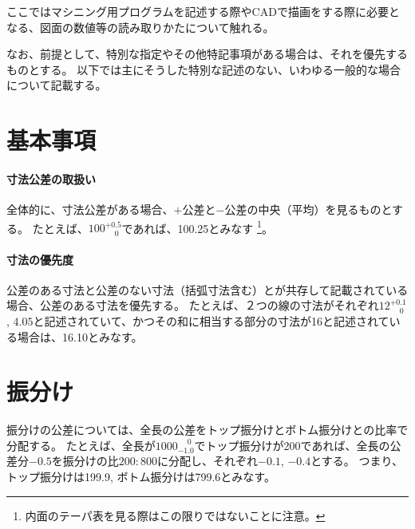 
ここではマシニング用プログラムを記述する際やCADで描画をする際に必要となる、図面の数値等の読み取りかたについて触れる。

なお、前提として、特別な指定やその他特記事項がある場合は、それを優先するものとする。
以下では主にそうした特別な記述のない、いわゆる一般的な場合について記載する。




\section{基本事項}
\paragraph{寸法公差の取扱い}\noindent
全体的に、寸法公差がある場合、$+$公差と$-$公差の中央（平均）を見るものとする。
たとえば、$100^{+0.5}_{\phantom -0}$であれば、100.25とみなす
\footnote{内面のテーパ表を見る際はこの限りではないことに注意。}。

\paragraph{寸法の優先度}\noindent
公差のある寸法と公差のない寸法（括弧寸法含む）とが共存して記載されている場合、公差のある寸法を優先する。
たとえば、２つの線の寸法がそれぞれ$12^{+0.1}_{\phantom -0}$, $4.05$と記述されていて、かつその和に相当する部分の寸法が16と記述されている場合は、16.10とみなす。




\section{振分け}
振分けの公差については、全長の公差をトップ振分けとボトム振分けとの比率で分配する。
たとえば、全長が$1000^{\phantom +0}_{-1.0}$でトップ振分けが200であれば、全長の公差分$-0.5$を振分けの比$200:800$に分配し、それぞれ$-0.1$, $-0.4$とする。
つまり、トップ振分けは199.9, ボトム振分けは799.6とみなす。

